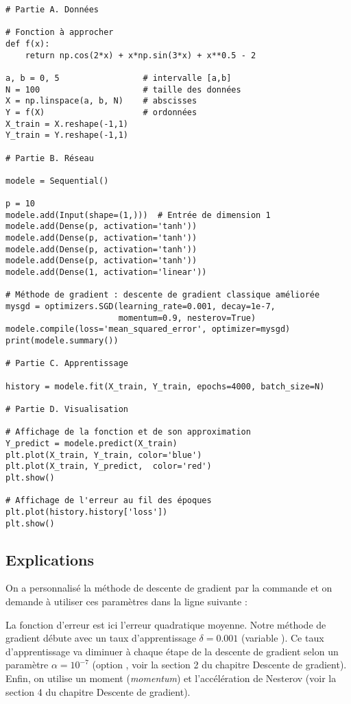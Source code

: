 \documentclass[11pt,class=report,crop=false]{standalone}
\begin{document}
\begin{lstlisting}
# Partie A. Données

# Fonction à approcher
def f(x):
    return np.cos(2*x) + x*np.sin(3*x) + x**0.5 - 2

a, b = 0, 5                 # intervalle [a,b]
N = 100                     # taille des données
X = np.linspace(a, b, N)    # abscisses
Y = f(X)                    # ordonnées
X_train = X.reshape(-1,1)
Y_train = Y.reshape(-1,1)

# Partie B. Réseau 

modele = Sequential()

p = 10
modele.add(Input(shape=(1,)))  # Entrée de dimension 1
modele.add(Dense(p, activation='tanh'))
modele.add(Dense(p, activation='tanh'))
modele.add(Dense(p, activation='tanh'))
modele.add(Dense(p, activation='tanh'))
modele.add(Dense(1, activation='linear'))

# Méthode de gradient : descente de gradient classique améliorée
mysgd = optimizers.SGD(learning_rate=0.001, decay=1e-7, 
                       momentum=0.9, nesterov=True)
modele.compile(loss='mean_squared_error', optimizer=mysgd)
print(modele.summary())

# Partie C. Apprentissage

history = modele.fit(X_train, Y_train, epochs=4000, batch_size=N)

# Partie D. Visualisation

# Affichage de la fonction et de son approximation
Y_predict = modele.predict(X_train)
plt.plot(X_train, Y_train, color='blue')
plt.plot(X_train, Y_predict,  color='red')
plt.show()

# Affichage de l'erreur au fil des époques
plt.plot(history.history['loss'])
plt.show()
\end{lstlisting}

\subsection{Explications}

On a personnalisé la méthode de descente de gradient par la commande 
et on demande à utiliser ces paramètres dans la ligne suivante :

La fonction d'erreur est ici l'erreur quadratique moyenne.
Notre méthode de gradient débute avec un taux d'apprentissage 
$\delta = 0.001$ (variable ).
Ce taux d'apprentissage va diminuer à chaque étape de la descente de gradient selon un paramètre $\alpha = 10^{-7}$ (option , voir la section 2 du chapitre \og{}Descente de gradient\fg{}).
Enfin, on utilise un moment (\emph{momentum}) et l'accélération de Nesterov (voir la section 4 du chapitre \og{}Descente de gradient\fg{}).
\end{document}
